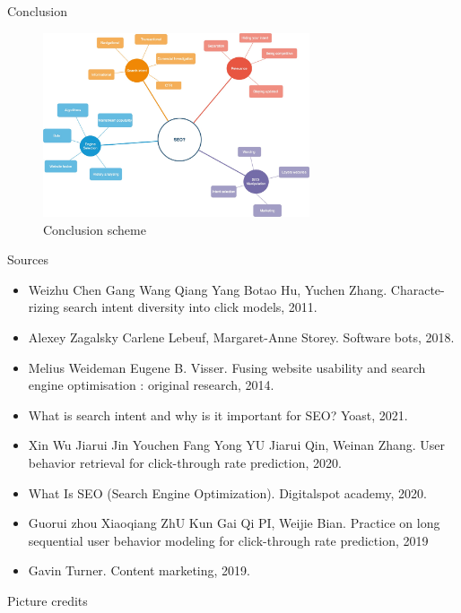 \documentclass[aspectratio=169]{beamer}
\begin{document}
{{\begin{frame}{Conclusion}
\begin{figure}[]
        \includegraphics[width=0.7\textwidth]{pics/diagram 2.jpg} \caption{Conclusion scheme \cite{conclusion}} 
    \end{figure}
\end{frame}    


\begin{frame}{Sources}
\begin{itemize}
    \item Weizhu Chen Gang Wang Qiang Yang Botao Hu, Yuchen Zhang. Characte-
rizing search intent diversity into click models, 2011.
    \item Alexey Zagalsky Carlene Lebeuf, Margaret-Anne Storey. Software bots,
2018.
    \item Melius Weideman Eugene B. Visser. Fusing website usability and search
engine optimisation : original research, 2014.
    \item What is search intent and why is it important for SEO? Yoast, 2021.
    \item Xin Wu Jiarui Jin Youchen Fang Yong YU Jiarui Qin, Weinan Zhang. User
behavior retrieval for click-through rate prediction, 2020.
\item What Is SEO (Search Engine Optimization). Digitalspot academy, 2020.
\item Guorui zhou Xiaoqiang ZhU Kun Gai Qi PI, Weijie Bian. Practice on long
sequential user behavior modeling for click-through rate prediction, 2019
\item Gavin Turner. Content marketing, 2019.
    \end{itemize}
\end{frame}


\begin{frame}{Picture credits}
\printbibliography 
    

\end{frame}}}
\end{document}
